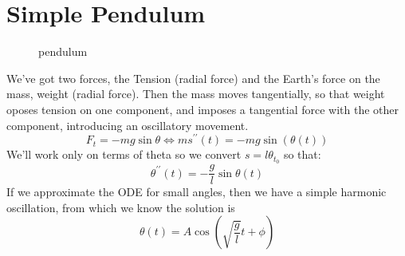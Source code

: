\documentclass{report}
\begin{document}
      \section{Simple Pendulum}
        \begin{figure}[h!]
          pendulum
        \end{figure}
        We've got two forces, the Tension (radial force) and the Earth's force on the mass, weight (radial force). Then the mass moves tangentially, so that weight oposes tension on one component, and imposes a tangential force with the other component, introducing an oscillatory movement.
        \[F_t=-mg\sin\theta\Longleftrightarrow ms^{\prime\prime}(t)=-mg\sin(\theta(t))\]
        We'll work only on terms of theta so we convert $s=l\theta_{t_0}$ so that:
        \[\theta^{\prime\prime}(t)=-\dfrac{g}{l}\sin{\theta}(t)\]
        If we approximate the ODE for small angles, then we have a simple harmonic oscillation, from which we know the solution is
        \begin{equation}
          \theta(t)=A\cos\left(\sqrt{\dfrac{g}{l}}t+\phi\right)
        \end{equation}
\end{document}
